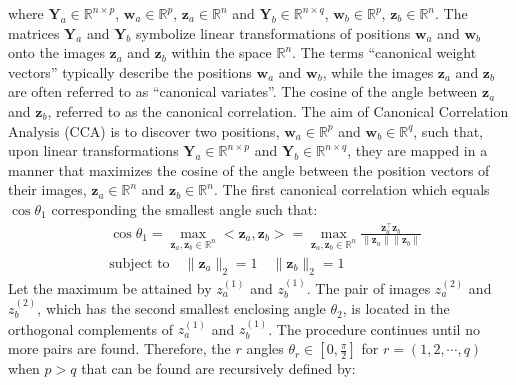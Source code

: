 where $\mathbf{Y}_a\in \mathbb{R}^{n\times p}$, ${\mathbf w}_a\in\mathbb{R}^p$, ${\mathbf z}_a\in\mathbb{R}^n$  and $\mathbf{Y}_b\in \mathbb{R}^{n\times q}$, $\mathbf{w}_b\in\mathbb{R}^p$, ${\mathbf z}_b\in\mathbb{R}^n$. The matrices $\mathbf{Y}_a$ and $\mathbf{Y}_b$ symbolize linear transformations of positions ${\mathbf w}_a$ and ${\mathbf w}_b$ onto the images ${\mathbf z}_a$ and ${\mathbf z}_b$ within the space $\mathbb{R}^n$. The terms ``canonical weight vectors'' typically describe the positions ${\mathbf w}_a$ and ${\mathbf w}_b$, while the images ${\mathbf z}_a$ and ${\mathbf z}_b$ are often referred to as ``canonical variates''. The cosine of the angle between ${\mathbf z}_a$ and ${\mathbf z}_b$, referred to as the canonical correlation. The aim of Canonical Correlation Analysis (CCA) is to discover two positions, $\mathbf{w}_a \in \mathbb{R}^p$ and $\mathbf{w}_b \in \mathbb{R}^q$, such that, upon linear transformations $\mathbf{Y}_a \in \mathbb{R}^{n\times p}$ and $\mathbf{Y}_b \in \mathbb{R}^{n\times q}$, they are mapped in a manner that maximizes the cosine of the angle between the position vectors of their images, $\mathbf{z}_a \in \mathbb{R}^n$ and $\mathbf{z}_b \in \mathbb{R}^n$. The first canonical correlation which equals $\cos\theta_1$ corresponding the smallest angle such that:
\begin{equation}
\begin{aligned}
&\cos \theta_1 = \underset{{\mathbf z}_a, {\mathbf z}_b \in\mathbb{R}^n}{\max}<{\mathbf z}_a, {\mathbf z}_b> 
			   = \underset{{\mathbf z}_a, {\mathbf z}_b \in\mathbb{R}^n}{\max}
			   		 \frac{\mathbf{z}_a^\top \mathbf{z}_b}{\|\mathbf{z}_a\| \|\mathbf{z}_b\|} \\
&\text{subject to}\quad \|{\mathbf z}_a\|_2=1\quad \|{\mathbf z}_b\|_2=1
\end{aligned}
\end{equation}
Let the maximum be attained by $z_{a}^{(1)}$ and $z_{b}^{(1)}$. The pair of images $z_{a}^{(2)}$ and $z_{b}^{(2)}$, which has the second smallest enclosing angle $\theta_2$, is located in the orthogonal complements of $z_{a}^{(1)}$ and $z_{b}^{(1)}$. The procedure continues until no more pairs are found. Therefore, the $r$ angles $\theta_r \in [0, \frac{\pi}{2}]$ for $r = (1,2,\cdots,q)$ when $p > q$ that can be found are recursively defined by:

